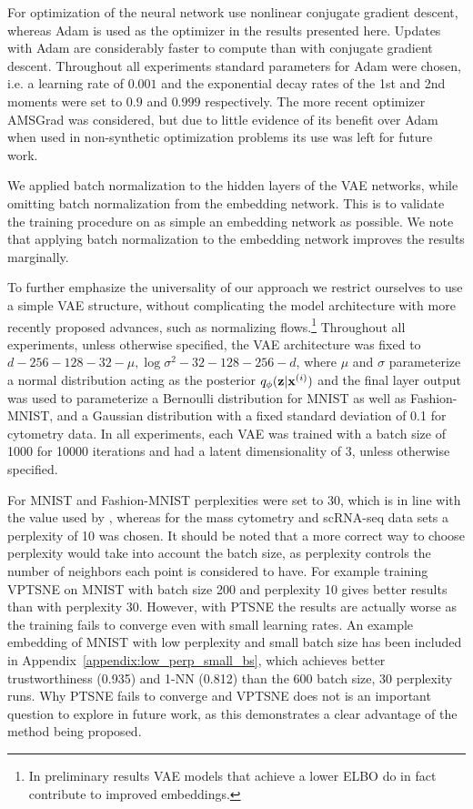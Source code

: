 For optimization of the neural network \cite{parametric_tsne} use nonlinear conjugate gradient descent, whereas Adam \citep{adam} is used as the optimizer in the results presented here. Updates with Adam are considerably faster to compute than with conjugate gradient descent. Throughout all experiments standard parameters for Adam were chosen, i.e. a learning rate of $0.001$ and the exponential decay rates of the 1st and 2nd moments were set to $0.9$ and $0.999$ respectively. The more recent optimizer AMSGrad \cite{on_the_convergence_of_adam} was considered, but due to little evidence of its benefit over Adam when used in non-synthetic optimization problems its use was left for future work.

We applied batch normalization \cite{batch_normalization} to the hidden layers of the VAE networks, while omitting batch normalization from the embedding network. This is to validate the training procedure on as simple an embedding network as possible. We note that applying batch normalization to the embedding network improves the results marginally.

To further emphasize the universality of our approach we restrict ourselves to use a simple VAE structure, without complicating the model architecture with more recently proposed advances, such as normalizing flows.\footnote{In preliminary results VAE models that achieve a lower ELBO do in fact contribute to improved embeddings.} Throughout all experiments, unless otherwise specified, the VAE architecture was fixed to $d - 256 - 128 - 32 - \mu, \log \sigma^2 - 32 - 128 - 256 - d$, where $\mu$ and $\sigma$ parameterize a normal distribution acting as the posterior $q_{\phi}(\mathbf{z} \vert \mathbf{x}^{(i)})$ and the final layer output was used to parameterize a Bernoulli distribution for MNIST as well as Fashion-MNIST, and a Gaussian distribution with a fixed standard deviation of 0.1 for cytometry data. In all experiments, each VAE was trained with a batch size of 1000 for 10000 iterations and had a latent dimensionality of $3$, unless otherwise specified.

For MNIST and Fashion-MNIST perplexities were set to 30, which is in line with the value used by \cite{parametric_tsne}, whereas for the mass cytometry and scRNA-seq data sets a perplexity of 10 was chosen. It should be noted that a more correct way to choose perplexity would take into account the batch size, as perplexity controls the number of neighbors each point is considered to have. For example training VPTSNE on MNIST with batch size 200 and perplexity 10 gives better results than with perplexity 30. However, with PTSNE the results are actually worse as the training fails to converge even with small learning rates. An example embedding of MNIST with low perplexity and small batch size has been included in Appendix~\ref{appendix:low_perp_small_bs}, which achieves better trustworthiness (0.935) and 1-NN (0.812) than the 600 batch size, 30 perplexity runs. Why PTSNE fails to converge and VPTSNE does not is an important question to explore in future work, as this demonstrates a clear advantage of the method being proposed.

